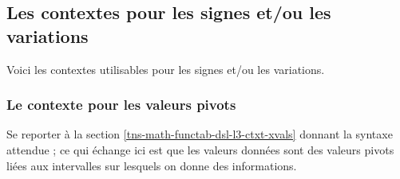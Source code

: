 \documentclass[10pt, a4paper]{article}
\begin{document}

\subsection{Les contextes pour les signes et/ou les variations}

Voici les contextes utilisables pour les signes et/ou les variations.

\medskip

\begin{itemize*}[before = \leavevmode\kern15pt, itemjoin = \kern15pt]
	\item {}

	\item {}

	\item {}
\end{itemize*}




\subsubsection{Le contexte  pour les valeurs pivots}

Se reporter à la section \ref{tns-math-functab-dsl-l3-ctxt-xvals} donnant la syntaxe attendue ; ce qui échange ici est que les valeurs données sont des valeurs pivots liées aux intervalles sur lesquels on donne des informations.
\end{document}
